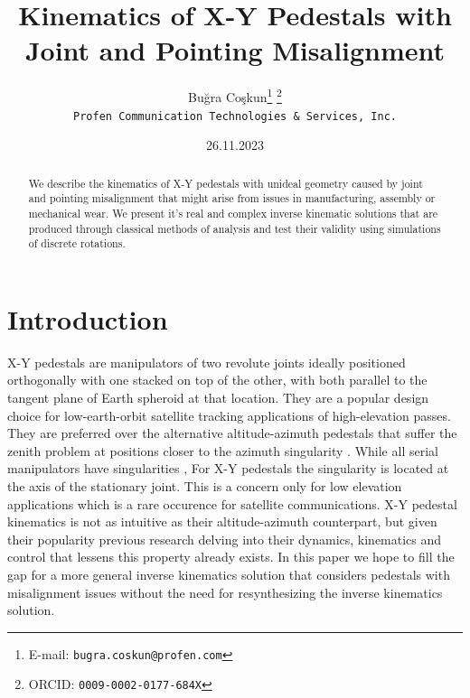 \documentclass[a4paper,twocolumn,10pt]{article}
\begin{document}
\title{Kinematics of X-Y Pedestals
with Joint and Pointing Misalignment } 
\author{Buğra Coşkun\thanks{E-mail:
\texttt{bugra.coskun@profen.com}}
\thanks{ORCID: \texttt{0009-0002-0177-684X}} \\
{\centering\footnotesize\texttt{Profen Communication Technologies \& 
Services, Inc.}}
}

\date{\vspace{-1ex}\scriptsize26.11.2023}
\maketitle
\vspace{-5ex}
\normalsize

\begin{abstract}
    We describe the kinematics of X-Y pedestals with unideal geometry caused by
    joint and pointing misalignment that might arise from issues in
    manufacturing, assembly or mechanical wear. We present it's real and
    complex inverse kinematic solutions that are produced through classical
    methods of analysis and test their validity using
    simulations of discrete rotations.
\end{abstract}

\section*{Introduction}
X-Y pedestals are manipulators of two revolute joints ideally positioned
orthogonally with one stacked on top of the other, with both parallel to the
tangent plane of Earth spheroid at that location. They are a popular design
choice for low-earth-orbit satellite tracking applications of high-elevation
passes. They are preferred over the alternative altitude-azimuth pedestals that
suffer the zenith problem at positions closer to the azimuth singularity
\cite{ji2003}. While all serial manipulators have singularities
\cite{gottlieb1986}, For X-Y pedestals the singularity is located at the axis
of the stationary joint. This is a concern only for low elevation applications
which is a rare occurence for satellite communications\cite{willey2000}. X-Y
pedestal kinematics is not as intuitive as their altitude-azimuth counterpart,
but given their popularity previous research delving into their dynamics,
kinematics and control that lessens this property already
exists\cite{tehrani2014}. In this paper we hope to fill the gap for a more
general inverse kinematics solution that considers pedestals with misalignment
issues without the need for resynthesizing the inverse kinematics solution.
\end{document}
